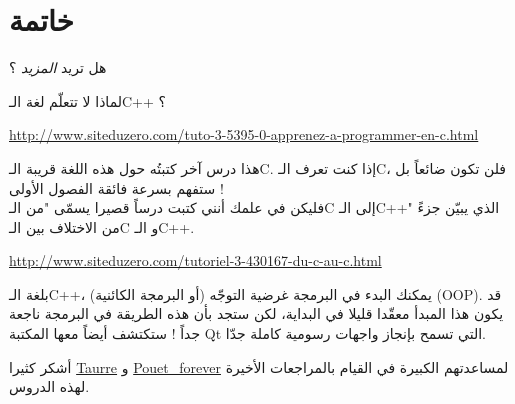 \chapter*{خاتمة}

هل تريد
\textit{المزيد}
؟

لماذا لا تتعلّم لغة الـ\textenglish{C++}
؟

\url{http://www.siteduzero.com/tuto-3-5395-0-apprenez-a-programmer-en-c.html}

 هذا درس آخر كتبتُه حول هذه اللغة قريبة الـ\textenglish{C}.
 إذا كنت تعرف الـ\textenglish{C}،
فلن تكون ضائعاً بل ستفهم بسرعة فائقة الفصول الأولى !\\
فليكن في علمك أنني كتبت درساً قصيرا يسمّى "من الـ\textenglish{C}
إلى الـ\textenglish{C++}"
الذي يبيّن جزءً من الاختلاف بين الـ\textenglish{C}
و الـ\textenglish{C++}.

\url{http://www.siteduzero.com/tutoriel-3-430167-du-c-au-c.html}

بلغة الـ\textenglish{C++}،
يمكنك البدء في البرمجة غرضية التوجّه (أو البرمجة الكائنية) (\textenglish{OOP}).
قد يكون هذا المبدأ معقّدا قليلا في البداية، لكن ستجد بأن هذه الطريقة في البرمجة ناجعة جداً ! ستكتشف أيضاً معها المكتبة
\textenglish{Qt}
التي تسمح بإنجاز واجهات رسومية كاملة جدّا.

أشكر كثيرا
\href{http://www.siteduzero.com/membres-294-45753.html}{Taurre}
و
\href{http://www.siteduzero.com/membres-294-181268.html}{Pouet\_forever}
لمساعدتهم الكبيرة في القيام بالمراجعات الأخيرة لهذه الدروس.
\cleardoublepage
